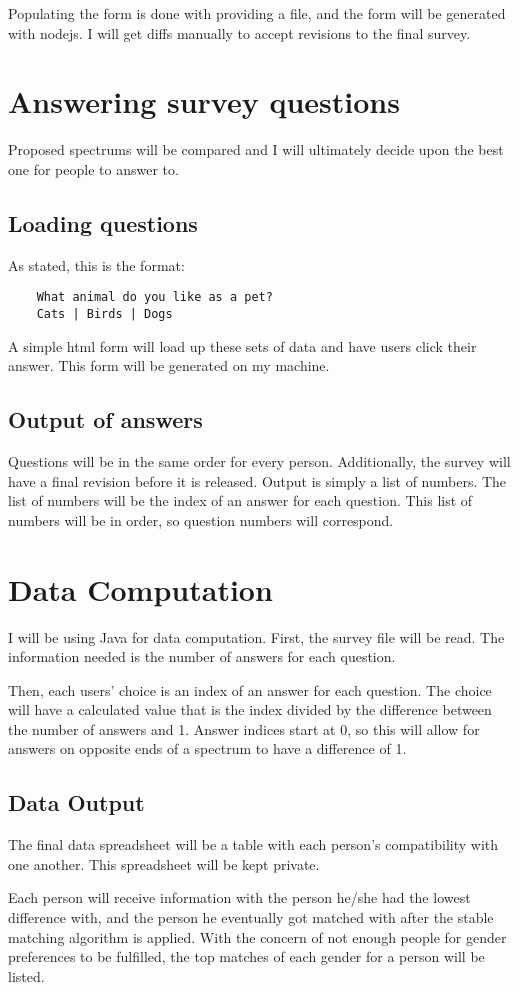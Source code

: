 \documentclass[12pt]{article}
\begin{document}
Populating the form is done with providing a file, and the form will be
generated with nodejs. I will get diffs manually to accept revisions to the
final survey.

\section{Answering survey questions}
Proposed spectrums will be compared and I will ultimately decide upon the best
one for people to answer to.

\subsection{Loading questions}
As stated, this is the format:
\begin{verbatim}
    What animal do you like as a pet?
    Cats | Birds | Dogs
\end{verbatim}

A simple html form will load up these sets of data and have users click their
answer. This form will be generated on my machine.

\subsection{Output of answers}
Questions will be in the same order for every person. Additionally, the survey
will have a final revision before it is released. Output is simply a list of
numbers. The list of numbers will be the index of an answer for each question.
This list of numbers will be in order, so question numbers will correspond.

\section{Data Computation}
I will be using Java for data computation.
First, the survey file will be read. The information needed is the number of
answers for each question.

Then, each users' choice is an index of an answer for each question. The choice
will have a calculated value that is the index divided by the difference between
the number of answers and 1. Answer indices start at 0, so this will allow for
answers on opposite ends of a spectrum to have a difference of 1.

\subsection{Data Output}
The final data spreadsheet will be a table with each person's compatibility with
one another. This spreadsheet will be kept private.

Each person will receive information with the person he/she had the lowest
difference with, and the person he eventually got matched with after the stable
matching algorithm is applied. With the concern of not enough people for gender
preferences to be fulfilled, the top matches of each gender for a person will
be listed.
\end{document}
